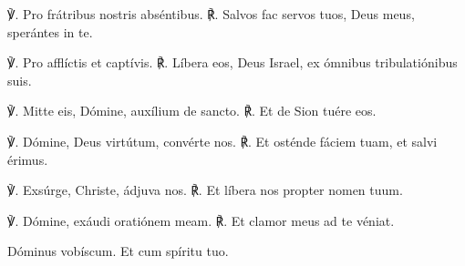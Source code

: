 ℣. Pro frátribus nostris abséntibus.
℟. Salvos fac servos tuos, Deus meus, sperántes in te.

℣. Pro afflíctis et captívis.
℟. Líbera eos, Deus Israel, ex ómnibus tribulatiónibus suis.

℣. Mitte eis, Dómine, auxílium de sancto.
℟. Et de Sion tuére eos.

℣. Dómine, Deus virtútum, convérte nos.
℟. Et osténde fáciem tuam, et salvi érimus.

℣. Exsúrge, Christe, ádjuva nos.
℟. Et líbera nos propter nomen tuum.

℣. Dómine, exáudi oratiónem meam.
℟. Et clamor meus ad te véniat.

\vv Dóminus vobíscum. \rr Et cum spíritu tuo.

